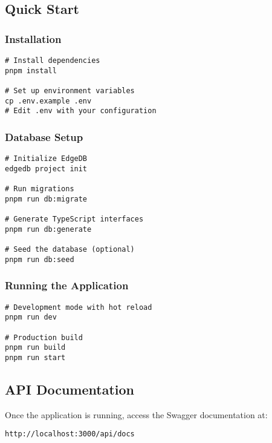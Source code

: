\subsection*{Quick Start}
\subsubsection*{Installation}
 \begin{tcolorbox}[width=\textwidth, boxrule=0.5pt, colback=gray!5, colframe=gray!50]
\begin{verbatim}
# Install dependencies
pnpm install

# Set up environment variables
cp .env.example .env
# Edit .env with your configuration
\end{verbatim}
\end{tcolorbox}
\subsubsection*{Database Setup}
 \begin{tcolorbox}[width=\textwidth, boxrule=0.5pt, colback=gray!5, colframe=gray!50]
\begin{verbatim}
# Initialize EdgeDB
edgedb project init

# Run migrations
pnpm run db:migrate

# Generate TypeScript interfaces
pnpm run db:generate

# Seed the database (optional)
pnpm run db:seed
\end{verbatim}
\end{tcolorbox}
\subsubsection*{Running the Application}
 \begin{tcolorbox}[width=\textwidth, boxrule=0.5pt, colback=gray!5, colframe=gray!50]
\begin{verbatim}
# Development mode with hot reload
pnpm run dev

# Production build
pnpm run build
pnpm run start
\end{verbatim}
\end{tcolorbox}
\subsection*{API Documentation}
Once the application is running, access the Swagger documentation at:
\begin{tcolorbox}[width=\textwidth, boxrule=0.5pt, colback=gray!5, colframe=gray!50]
\begin{verbatim}
http://localhost:3000/api/docs
\end{verbatim}
\end{tcolorbox}
